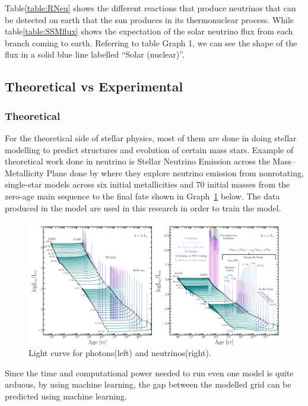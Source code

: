 Table\ref{table:RNeu}  shows the different reactions that produce neutrinos that can be detected on earth that the sun produces in its thermonuclear process. While table\ref{table:SSMflux}  shows the expectation of the solar neutrino flux from each branch coming to earth. Referring to table Graph 1, we can see the shape of the flux in a solid blue line labelled ``Solar (nuclear)''.

\subsection{Theoretical vs Experimental}

\subsubsection{Theoretical}
For the theoretical side of stellar physics, most of them are done in doing stellar modelling to predict structures and evolution of certain mass stars. Example of theoretical work done in neutrino is Stellar Neutrino Emission across the Mass–Metallicity Plane done by  where they explore neutrino emission from nonrotating, single-star models across six initial metallicities and 70 initial masses from the zero-age main sequence to the final fate shown in Graph~\ref{Graph:Lcurve} below. The data produced in the model are used in this research in order to train the model.
\begin{figure}[H]
	\centering
	\includegraphics[width=\textwidth]{assets/FaragLA.png}
	\caption{Light curve for photons(left) and neutrinos(right).}
	\label{Graph:Lcurve}
\end{figure}

Since the time and computational power needed to run even one model is quite arduous, by using machine learning, the gap between the modelled grid can be predicted using machine learning.

